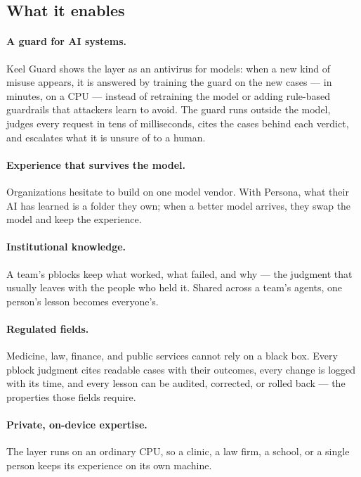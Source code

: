 \documentclass[11pt]{article}
\begin{document}
\subsection{What it enables}
\paragraph{A guard for AI systems.} Keel Guard shows the layer as an antivirus for models: when a new kind of misuse appears, it is answered by training the guard on the new cases --- in minutes, on a CPU --- instead of retraining the model or adding rule-based guardrails that attackers learn to avoid. The guard runs outside the model, judges every request in tens of milliseconds, cites the cases behind each verdict, and escalates what it is unsure of to a human.

\paragraph{Experience that survives the model.} Organizations hesitate to build on one model vendor. With Persona, what their AI has learned is a folder they own; when a better model arrives, they swap the model and keep the experience.

\paragraph{Institutional knowledge.} A team's pblocks keep what worked, what failed, and why --- the judgment that usually leaves with the people who held it. Shared across a team's agents, one person's lesson becomes everyone's.

\paragraph{Regulated fields.} Medicine, law, finance, and public services cannot rely on a black box. Every pblock judgment cites readable cases with their outcomes, every change is logged with its time, and every lesson can be audited, corrected, or rolled back --- the properties those fields require.

\paragraph{Private, on-device expertise.} The layer runs on an ordinary CPU, so a clinic, a law firm, a school, or a single person keeps its experience on its own machine.
\end{document}
